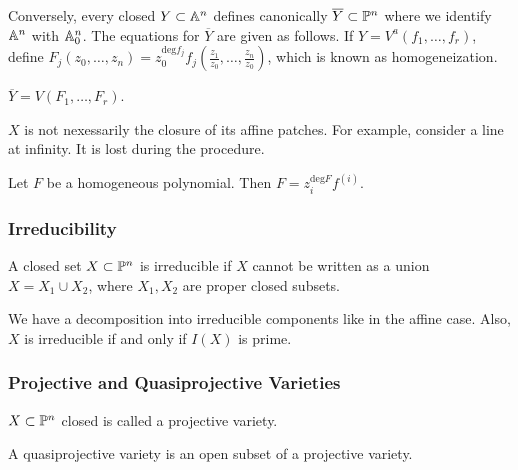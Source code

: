 \documentclass[twoside, 10pt]{article}
\begin{document}
    Conversely, every closed $Y \subset \A^n$ defines canonically $\overline{Y}
    \subset \P^n$ where we identify $\A^n$ with $\A_0^n$. The equations for
    $\overline{Y}$ are given as follows. If $Y = V^a(f_1, \ldots, f_r)$, define
    $F_j(z_0, \ldots, z_n) = z_0^{\mathrm{deg} f_j} f_j \left( \frac{z_1}{z_0},
    \ldots, \frac{z_n}{z_0} \right)$, which is known as homogeneization. 

    \begin{prop} $\overline{Y} = V(F_1, \ldots, F_r)$.  \end{prop}

    \begin{rmk} $X$ is not nexessarily the closure of its affine patches. For
    example, consider a line at infinity. It is lost during the procedure.
\end{rmk}

    \begin{rmk} Let $F$ be a homogeneous polynomial. Then $F =
    z_i^{\mathrm{deg} F} f^{(i)}$.  \end{rmk}

    \subsubsection{Irreducibility} \begin{defn} A closed set $X \subset \P^n$
    is irreducible if $X$ cannot be written as a union $X = X_1 \cup X_2$,
where $X_1, X_2$ are proper closed subsets.  \end{defn}

    \begin{rmk} We have a decomposition into irreducible components like in the
    affine case. Also, $X$ is irreducible if and only if $I(X)$ is prime.
\end{rmk}

    \subsubsection{Projective and Quasiprojective Varieties}
    \begin{defn} $X \subset \P^n$ closed is called a
    projective variety.  \end{defn}

    \begin{defn} A quasiprojective variety is an open
    subset of a projective variety.  \end{defn}
\end{document}
